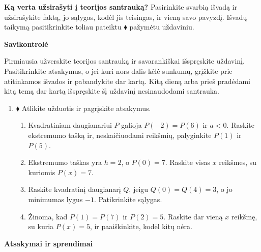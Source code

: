 \documentclass[12pt,a4paper]{article}
\begin{document}
\textbf{Ką verta užsirašyti į teorijos santrauką?} Pasirinkite svarbią išvadą ir užsirašykite faktą, jo sąlygas, kodėl jis teisingas, ir vieną savo pavyzdį. Išvadų taikymą pasitikrinkite toliau pateiktu $\blacklozenge$ pažymėtu uždaviniu.
\newpage
\begin{center}{\Large\bfseries Savikontrolė}\end{center}
Pirmiausia užverskite teorijos santrauką ir savarankiškai išspręskite uždavinį. Pasitikrinkite atsakymus, o jei kuri nors dalis kėlė sunkumų, grįžkite prie atitinkamos išvados ir pabandykite dar kartą. Kitą dieną arba prieš pradėdami kitą temą dar kartą išspręskite šį uždavinį nesinaudodami santrauka.
\begin{enumerate}[resume]
\item $\blacklozenge$ Atlikite užduotis ir pagrįskite atsakymus.
\begin{enumerate}
\item Kvadratiniam daugianariui $P$ galioja $P(-2)=P(6)$ ir $a<0$. Raskite ekstremumo tašką ir, neskaičiuodami reikšmių, palyginkite $P(1)$ ir $P(5)$.
\item Ekstremumo taškas yra $h=2$, o $P(0)=7$. Raskite visas $x$ reikšmes, su kuriomis $P(x)=7$.
\item Raskite kvadratinį daugianarį $Q$, jeigu $Q(0)=Q(4)=3$, o jo minimumas lygus $-1$. Patikrinkite sąlygas.
\item Žinoma, kad $P(1)=P(7)$ ir $P(2)=5$. Raskite dar vieną $x$ reikšmę, su kuria $P(x)=5$, ir paaiškinkite, kodėl kitų nėra.
\end{enumerate}
\end{enumerate}
\newpage\begin{center}{\Large\bfseries Atsakymai ir sprendimai}\end{center}
\end{document}
